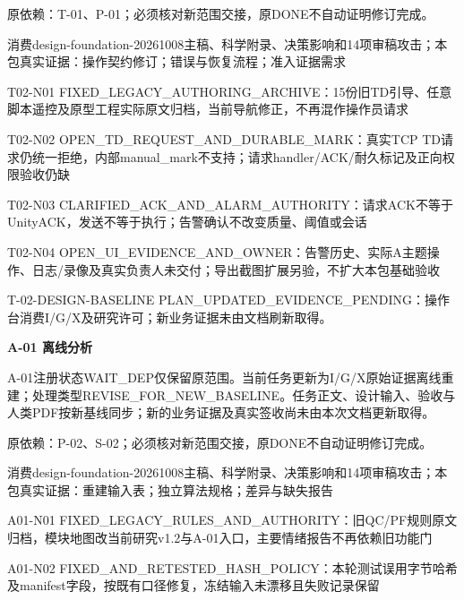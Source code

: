 \documentclass[11pt,a4paper]{article}
\newcommand{\reviewsection}[1]{\par\Needspace{5\baselineskip}\vspace{10pt}\begin{center}{\titlelatin\titlecjk\bfseries\fontsize{14}{20}\selectfont #1}\end{center}}
\begin{document}
原依赖：T-\allowbreak{}01、P-\allowbreak{}01；必须核对新范围交接，原DONE不自动证明修订完成。


消费design-\allowbreak{}foundation-\allowbreak{}20261008主稿、科学附录、决策影响和14项审稿攻击；本包真实证据：操作契约修订；错误与恢复流程；准入证据需求


T02-\allowbreak{}N01 FIXED\_\allowbreak{}LEGACY\_\allowbreak{}AUTHORING\_\allowbreak{}ARCHIVE：15份旧TD引导、任意脚本遥控及原型工程实际原文归档，当前导航修正，不再混作操作员请求


T02-\allowbreak{}N02 OPEN\_\allowbreak{}TD\_\allowbreak{}REQUEST\_\allowbreak{}AND\_\allowbreak{}DURABLE\_\allowbreak{}MARK：真实TCP TD请求仍统一拒绝，内部manual\_\allowbreak{}mark不支持；请求handler/\allowbreak{}ACK/\allowbreak{}耐久标记及正向权限验收仍缺


T02-\allowbreak{}N03 CLARIFIED\_\allowbreak{}ACK\_\allowbreak{}AND\_\allowbreak{}ALARM\_\allowbreak{}AUTHORITY：请求ACK不等于UnityACK，发送不等于执行；告警确认不改变质量、阈值或会话


T02-\allowbreak{}N04 OPEN\_\allowbreak{}UI\_\allowbreak{}EVIDENCE\_\allowbreak{}AND\_\allowbreak{}OWNER：告警历史、实际A主题操作、日志/\allowbreak{}录像及真实负责人未交付；导出截图扩展另验，不扩大本包基础验收


T-\allowbreak{}02-\allowbreak{}DESIGN-\allowbreak{}BASELINE PLAN\_\allowbreak{}UPDATED\_\allowbreak{}EVIDENCE\_\allowbreak{}PENDING：操作台消费I/\allowbreak{}G/\allowbreak{}X及研究许可；新业务证据未由文档刷新取得。


\reviewsection{A-\allowbreak{}01 离线分析}
A-\allowbreak{}01注册状态WAIT\_\allowbreak{}DEP仅保留原范围。当前任务更新为I/\allowbreak{}G/\allowbreak{}X原始证据离线重建；处理类型REVISE\_\allowbreak{}FOR\_\allowbreak{}NEW\_\allowbreak{}BASELINE。任务正文、设计输入、验收与人类PDF按新基线同步；新的业务证据及真实签收尚未由本次文档更新取得。


原依赖：P-\allowbreak{}02、S-\allowbreak{}02；必须核对新范围交接，原DONE不自动证明修订完成。


消费design-\allowbreak{}foundation-\allowbreak{}20261008主稿、科学附录、决策影响和14项审稿攻击；本包真实证据：重建输入表；独立算法规格；差异与缺失报告


A01-\allowbreak{}N01 FIXED\_\allowbreak{}LEGACY\_\allowbreak{}RULES\_\allowbreak{}AND\_\allowbreak{}AUTHORITY：旧QC/\allowbreak{}PF规则原文归档，模块地图改当前研究v1.2与A-\allowbreak{}01入口，主要情绪报告不再依赖旧功能门


A01-\allowbreak{}N02 FIXED\_\allowbreak{}AND\_\allowbreak{}RETESTED\_\allowbreak{}HASH\_\allowbreak{}POLICY：本轮测试误用字节哈希及manifest字段，按既有口径修复，冻结输入未漂移且失败记录保留
\end{document}
